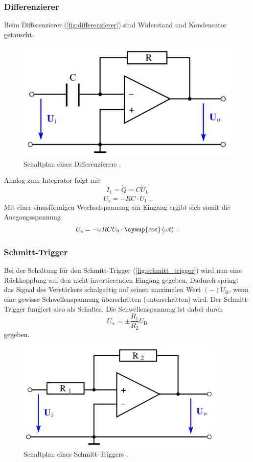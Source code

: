 \subsubsection{Differenzierer}
Beim Differenzierer (\autoref{fig:differenzierer}) sind Widerstand und Kondensator getauscht.
\begin{figure}
    \centering
    \includegraphics[width = .5\textwidth]{"content/pics/differenzierer.png"}
    \caption{Schaltplan eines Differenzierers \cite{v51}.}
    \label{fig:differenzierer}
\end{figure}
Analog zum Integrator folgt mit 
\begin{equation*}
    I_1 = \dot{Q} = C \dot{U}_1
\end{equation*}
\begin{equation}
    U_\text{a} = -RC \cdot \dot{U}_1 \;.
    \label{eq:differenzierer1}
\end{equation}
Mit einer sinusförmigen Wechselspannung am Eingang ergibt sich somit die Ausgangsspannung
\begin{equation}
    U_\text{a} = -\omega RC U_0 \cdot \symup{cos}\left(\omega t\right) \;.
    \label{eq:differenzierer2}
\end{equation}
\subsubsection{Schmitt-Trigger}
Bei der Schaltung für den Schmitt-Trigger (\autoref{fig:schmitt_trigger}) wird nun eine Rückkopplung auf den nicht-invertierenden Eingang gegeben.
Dadurch springt das Signal des Verstärkers schalgartig auf seinen maximalen Wert $(-) U_\text{B}$, wenn eine gewisse Schwellenspannung überschritten (unterschritten) wird.
Der Schmitt-Trigger fungiert also als Schalter.
Die Schwellenspannung ist dabei durch 
\begin{equation}
    U_{\pm} = \pm \frac{R_1}{R_2} U_\text{B}
    \label{eq:schmitt_trigger}
\end{equation}
gegeben.
\begin{figure}
    \centering
    \includegraphics[width = .5\textwidth]{"content/pics/schmitt_trigger.png"}
    \caption{Schaltplan eines Schmitt-Triggers \cite{v51}.}
    \label{fig:schmitt_trigger}
\end{figure}

